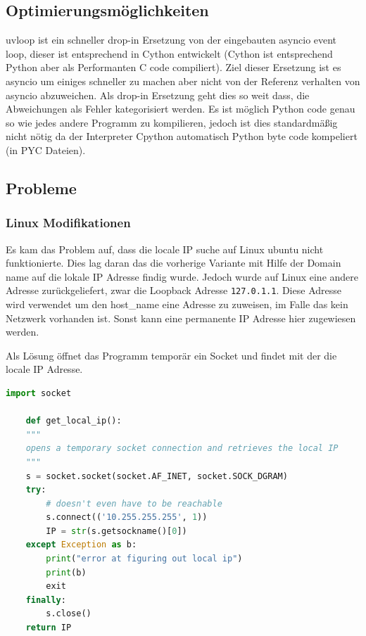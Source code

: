 \subsection{Optimierungsmöglichkeiten}
\label{subsec:Optimierungsmöglichkeiten}
uvloop ist ein schneller drop-in Ersetzung von der eingebauten asyncio event loop, 
dieser ist entsprechend in Cython entwickelt (Cython ist entsprechend Python aber als Performanten C code compiliert).
Ziel dieser Ersetzung ist es asyncio um einiges schneller zu machen aber nicht von der Referenz verhalten von asyncio abzuweichen. 
Als drop-in Ersetzung geht dies so weit dass, die Abweichungen als Fehler kategorisiert werden.
Es ist möglich Python code genau so wie jedes andere Programm zu kompilieren,
jedoch ist dies standardmäßig nicht nötig da der Interpreter Cpython automatisch Python byte code kompeliert (in PYC Dateien).

\subsection{Probleme}
\subsubsection{Linux Modifikationen}
Es kam das Problem auf, dass die locale IP suche auf Linux ubuntu nicht funktionierte.
Dies lag daran das die vorherige Variante 
mit Hilfe der Domain name auf die lokale IP Adresse findig wurde.
Jedoch wurde auf Linux eine andere Adresse zurückgeliefert, 
zwar die Loopback Adresse \texttt{127.0.1.1}. 
Diese Adresse wird verwendet um den host\_name eine Adresse zu zuweisen,
im Falle das kein Netzwerk vorhanden ist. 
Sonst kann eine permanente IP Adresse hier zugewiesen werden.

Als Lösung öffnet das Programm temporär ein Socket und findet mit der die locale IP Adresse.
\begin{lstlisting}[language=python, gobble=4]
    import socket

    def get_local_ip():
    """
    opens a temporary socket connection and retrieves the local IP
    """
    s = socket.socket(socket.AF_INET, socket.SOCK_DGRAM)
    try:
        # doesn't even have to be reachable
        s.connect(('10.255.255.255', 1))
        IP = str(s.getsockname()[0])
    except Exception as b:
        print("error at figuring out local ip")
        print(b)
        exit
    finally:
        s.close()
    return IP
\end{lstlisting}

